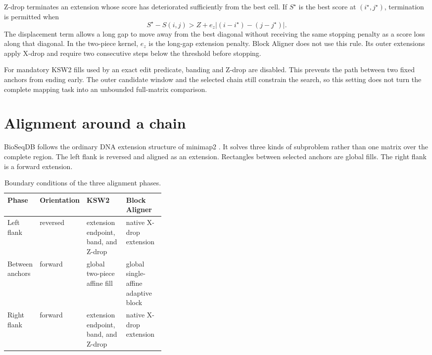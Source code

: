 Z-drop terminates an extension whose score has deteriorated sufficiently from
the best cell. If \(S^\star\) is the best score at
\((i^\star,j^\star)\), termination is permitted when
\begin{equation}
 S^\star-S(i,j)>
 Z+e_z\left|(i-i^\star)-(j-j^\star)\right|.
 \label{eq:zdrop}
\end{equation}
The displacement term allows a long gap to move away from the best diagonal
without receiving the same stopping penalty as a score loss along that
diagonal. In the two-piece kernel, \(e_z\) is the long-gap extension penalty.
Block Aligner does not use this rule. Its outer extensions apply X-drop and
require two consecutive steps below the threshold before stopping.

For mandatory KSW2 fills used by an exact edit predicate, banding and Z-drop
are disabled. This prevents the path between two fixed anchors from ending
early. The outer candidate window and the selected chain still constrain the
search, so this setting does not turn the complete mapping task into an
unbounded full-matrix comparison.

\clearpage
\section{Alignment around a chain}
\label{sec:final-alignment-three-phase}

BioSeqDB follows the ordinary DNA extension structure of minimap2
\cite{minimap2_paper}. It solves three kinds of subproblem rather than one
matrix over the complete region. The left flank is reversed and aligned as an
extension. Rectangles between selected anchors are global fills. The right
flank is a forward extension.

\begin{table}[htbp]
\centering
\small
\caption{Boundary conditions of the three alignment phases.}
\label{tab:alignment-phase-contracts}
\setlength{\tabcolsep}{4pt}
\begin{tabularx}{\linewidth}{@{}p{0.18\linewidth}p{0.19\linewidth}X X@{}}
\toprule
\textbf{Phase} & \textbf{Orientation} & \textbf{KSW2} & \textbf{Block Aligner}\\
\midrule
Left flank & reversed & extension endpoint, band, and Z-drop & native X-drop
extension\\
Between anchors & forward & global two-piece affine fill & global
single-affine adaptive block\\
Right flank & forward & extension endpoint, band, and Z-drop & native X-drop
extension\\
\bottomrule
\end{tabularx}
\end{table}

